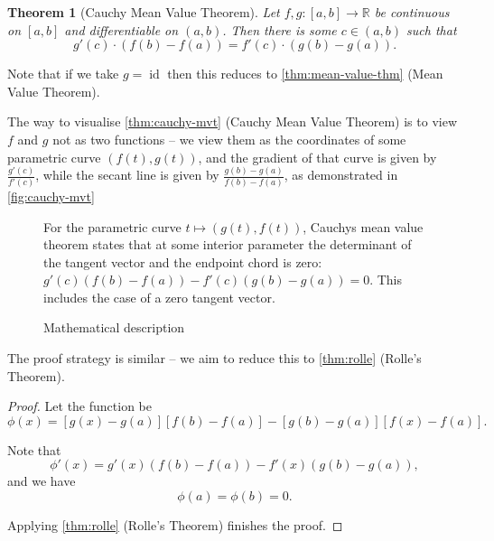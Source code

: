 \documentclass[11pt]{article}
\numberwithin{equation}{section}
\newtheorem{theorem}{Theorem}[section]
\theoremstyle{definition}
\theoremstyle{remark}
\newcommand{\pqty}[1]{\left(#1\right)}
\newcommand{\bqty}[1]{\left[#1\right]}
\newcommand{\ccintv}[2]{[#1,#2]}
\newcommand{\oointv}[2]{(#1,#2)}
\newcommand{\functiondomain}[3]{#1:#2\to #3}
\newcommand{\RR}{\mathbb R}
\DeclareMathOperator{\identity}{id}
\begin{document}
\begin{theorem}[Cauchy Mean Value Theorem]\label{analysis-unit-0119}
    \label{thm:cauchy-mvt}%
    Let \(\functiondomain{f, g}{\ccintv{a}{b}}{\RR}\) be continuous on \(\ccintv{a}{b}\) and differentiable on \(\oointv{a}{b}\). Then there is some \(c \in \oointv{a}{b}\) such that
    \[
        g'\pqty{c} \cdot \pqty{f\pqty{b} - f\pqty{a}} = f'\pqty{c} \cdot \pqty{g\pqty{b} - g\pqty{a}}.
    \]
\end{theorem}

Note that if we take \(g = \identity\) then this reduces to \autoref{thm:mean-value-thm} (Mean Value Theorem).

The way to visualise \autoref{thm:cauchy-mvt} (Cauchy Mean Value Theorem) is to view \(f\) and \(g\) not as two functions -- we view them as the coordinates of some parametric curve \(\pqty{f\pqty{t}, g\pqty{t}}\), and the gradient of that curve is given by \(\frac{g'\pqty{c}}{f'\pqty{c}}\), while the secant line is given by \(\frac{g\pqty{b} - g\pqty{a}}{f\pqty{b} - f\pqty{a}}\), as demonstrated in \autoref{fig:cauchy-mvt}

\begin{figure}[ht!]\centering\begin{minipage}{.94\linewidth}For the parametric curve \(t\mapsto(g(t),f(t))\), Cauchy\textquotesingle s mean value theorem states that at some interior parameter the determinant of the tangent vector and the endpoint chord is zero: \(g\prime(c)(f(b)-f(a))-f\prime(c)(g(b)-g(a))=0\). This includes the case of a zero tangent vector.\end{minipage}\caption{Mathematical description}\label{fig:cauchy-mvt}\end{figure}

The proof strategy is similar -- we aim to reduce this to \autoref{thm:rolle} (Rolle's Theorem).

\begin{proof}
    Let the function be
    \[
        \phi\pqty{x} = \bqty{g\pqty{x} - g\pqty{a}} \bqty{f\pqty{b} - f\pqty{a}} - \bqty{g\pqty{b} - g\pqty{a}} \bqty{f\pqty{x} - f\pqty{a}}.
    \]

    Note that
    \[
        \phi'\pqty{x} = g'\pqty{x} \pqty{f\pqty{b} - f\pqty{a}} - f'\pqty{x} \pqty{g\pqty{b} - g\pqty{a}},
    \]
    and we have
    \[
        \phi\pqty{a} = \phi\pqty{b} = 0.
    \]

    Applying \autoref{thm:rolle} (Rolle's Theorem) finishes the proof.
\end{proof}
\end{document}
